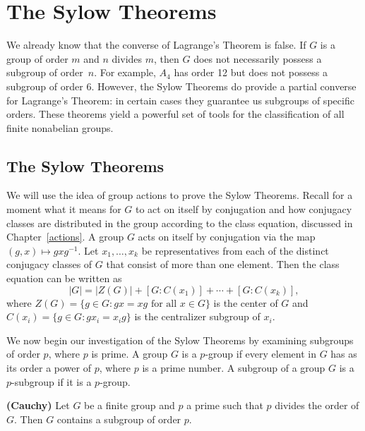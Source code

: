 \chapter{The Sylow Theorems}\label{sylow}
 
We already know that the converse of Lagrange's Theorem is false.  If $G$ is a group of order $m$ and $n$ divides $m$, then $G$ does not necessarily possess a subgroup of order~$n$.  For example, $A_4$ has order 12 but does not possess a subgroup of order 6.  However, the Sylow Theorems do provide a partial converse for Lagrange's Theorem: in certain cases they guarantee us subgroups of specific orders.  These theorems yield a powerful set of tools for the classification of all finite nonabelian groups.  

 
\section{The Sylow Theorems}

We will use the idea of  group actions to prove the Sylow Theorems.  Recall for a moment what it means for $G$ to act on itself by
conjugation and how conjugacy classes are distributed in the group according to the class equation, discussed in Chapter~\ref{actions}.   A group  $G$ acts on itself by conjugation via the map $(g,x) \mapsto gxg^{-1}$. Let $x_1, \ldots,
x_k$ be representatives from each  of the distinct conjugacy classes
of $G$ that consist of more than one element. Then the class equation
can be written as 
\[
|G| = |Z(G)| + [G: C(x_1) ] + \cdots + [ G: C(x_k)],
\]
where $Z(G) = \{g \in G : gx = xg \mbox{ for all $x \in G$} \}$ is the
center of $G$ and  $C(x_i) = \{ g \in G : g x_i = x_i g \}$ is the
centralizer subgroup of $x_i$. 
 
We now begin our investigation of the Sylow Theorems by examining
subgroups of order $p$, where $p$ is prime. A group $G$ is a {\bfi
$p$-group\/} if every element in $G$ has as
its order
a power of $p$, where $p$ is a prime number. A subgroup of a group $G$
is a {\bfi $p$-subgroup\/} if it is a 
$p$-group.  
 
\begin{theorem} {\bf (Cauchy)}
Let $G$ be a finite group and $p$ a prime such that $p$ divides the
order of $G$. Then $G$ contains a subgroup of order $p$.
\end{theorem}
 

